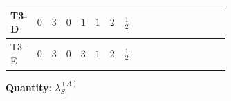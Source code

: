 \documentclass[8pt]{article}
\begin{document}
\begin{landscape}
\begin{longtable}{@{}llcccccc >{\raggedright\arraybackslash}p{0.21\linewidth} >{\raggedright\arraybackslash}p{0.21\linewidth} >{\raggedright\arraybackslash}p{0.21\linewidth}@{}}
T3-D & $0$ & $3$ & $0$ & $1$ & $1$ & $2$ & $\frac{1}{2}$ & \scriptsize\adjustbox{max width=\linewidth}{$\begin{gathered} +\frac{{\lambda_{HS_1}^{(1)}}^2}{2}\end{gathered}$} & \scriptsize\adjustbox{max width=\linewidth}{$\begin{gathered} +3 {\lambda_{HS_1}^{(A)}}^2\end{gathered}$} & \scriptsize\adjustbox{max width=\linewidth}{$\begin{gathered} +\frac{7 {\lambda_{S_1}^{(1)}}^2}{4}\end{gathered}$} \\
\midrule
T3-E & $0$ & $3$ & $0$ & $3$ & $1$ & $2$ & $\frac{1}{2}$ & \scriptsize\adjustbox{max width=\linewidth}{$\begin{gathered} +\frac{{\lambda_{HS_1}^{(1)}}^2}{2}\end{gathered}$} & \scriptsize\adjustbox{max width=\linewidth}{$\begin{gathered} +3 {\lambda_{HS_1}^{(A)}}^2\end{gathered}$} & \scriptsize\adjustbox{max width=\linewidth}{$\begin{gathered} +\frac{7 {\lambda_{S_1}^{(1)}}^2}{4}\end{gathered}$} \\
\midrule
\bottomrule
\end{longtable}
\clearpage
\noindent\textbf{Quantity: }$\lambda_{S_1}^{(A)}$\par\smallskip

\end{landscape}
\end{document}
